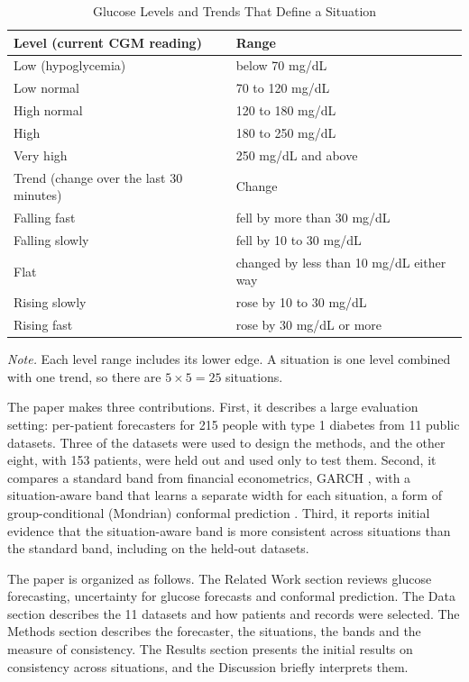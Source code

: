 \begin{table}[htbp]
\caption{Glucose Levels and Trends That Define a Situation}
\label{tab:situations}
\small
\begin{tabular}{ll}
\hline
Level (current CGM reading) & Range \\
\hline
Low (hypoglycemia) & below 70 mg/dL \\
Low normal & 70 to 120 mg/dL \\
High normal & 120 to 180 mg/dL \\
High & 180 to 250 mg/dL \\
Very high & 250 mg/dL and above \\
\hline
Trend (change over the last 30 minutes) & Change \\
\hline
Falling fast & fell by more than 30 mg/dL \\
Falling slowly & fell by 10 to 30 mg/dL \\
Flat & changed by less than 10 mg/dL either way \\
Rising slowly & rose by 10 to 30 mg/dL \\
Rising fast & rose by 30 mg/dL or more \\
\hline
\end{tabular}

\vspace{2pt}
\noindent\textit{Note.} Each level range includes its lower edge. A situation is one level combined with one trend, so there are $5 \times 5 = 25$ situations.
\end{table}

The paper makes three contributions. First, it describes a large evaluation setting: per-patient forecasters for 215 people with type 1 diabetes from 11 public datasets. Three of the datasets were used to design the methods, and the other eight, with 153 patients, were held out and used only to test them. Second, it compares a standard band from financial econometrics, GARCH \parencite{bollerslev1986garch}, with a situation-aware band that learns a separate width for each situation, a form of group-conditional (Mondrian) conformal prediction \parencite{vovk2005alrw}. Third, it reports initial evidence that the situation-aware band is more consistent across situations than the standard band, including on the held-out datasets.

The paper is organized as follows. The Related Work section reviews glucose forecasting, uncertainty for glucose forecasts and conformal prediction. The Data section describes the 11 datasets and how patients and records were selected. The Methods section describes the forecaster, the situations, the bands and the measure of consistency. The Results section presents the initial results on consistency across situations, and the Discussion briefly interprets them. 

